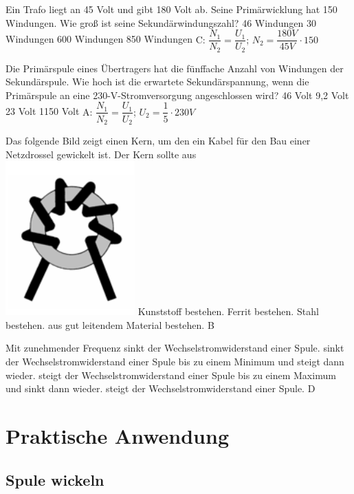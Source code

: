 {Ein Trafo liegt an 45 Volt und gibt 180 Volt ab. Seine Primärwicklung hat 150 Windungen. Wie groß ist seine Sekundärwindungszahl?}%
{46 Windungen}%
{30 Windungen}%
{600 Windungen}%
{850 Windungen}%
{C: $\dfrac{N_1}{N_2} = \dfrac{U_1}{U_2}$; $N_2 = \dfrac{180V}{45V} \cdot 150$}%

{Die Primärspule eines Übertragers hat die fünffache Anzahl von Windungen der Sekundärspule. Wie hoch ist die erwartete Sekundärspannung, wenn die Primärspule an eine 230-V-Stromversorgung angeschlossen wird?}%
{46 Volt}%
{9,2 Volt}%
{23 Volt}%
{1150 Volt}%
{A: $\dfrac{N_1}{N_2} = \dfrac{U_1}{U_2}$; $U_2 = \dfrac{1}{5} \cdot 230V$}%

{Das folgende Bild zeigt einen Kern, um den ein Kabel für den Bau einer Netzdrossel gewickelt ist. Der Kern sollte aus\\ \includegraphics[scale=0.9]{Spule/Bilder/TC304.png}}%
{Kunststoff bestehen.}%
{Ferrit bestehen.}%
{Stahl bestehen.}%
{aus gut leitendem Material bestehen.}%
{B}%

{Mit zunehmender Frequenz}%
{sinkt der Wechselstromwiderstand einer Spule.}%
{sinkt der Wechselstromwiderstand einer Spule
bis zu einem Minimum und steigt dann wieder.}%
{steigt der Wechselstromwiderstand einer Spule
bis zu einem Maximum und sinkt dann wieder.}%
{steigt der Wechselstromwiderstand einer Spule.}%
{D}%

\newpage

\section*{Praktische Anwendung}

\subsection*{Spule wickeln}

